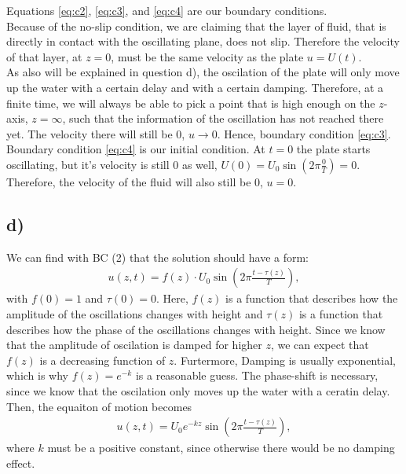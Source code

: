 \documentclass{article}
\begin{document}
Equations \ref{eq:c2}, \ref{eq:c3}, and \ref{eq:c4} are our boundary conditions. \\
Because of the no-slip condition, we are claiming that the layer of fluid, that is directly in contact with the oscillating plane, does not slip. Therefore the velocity of that layer,
 at $z = 0$, must be the same velocity as the plate $u = U(t)$. \\
As also will be explained in question d), the oscilation of the plate will only move up the water with a certain delay and with a certain damping. Therefore, at a finite time, 
we will always be able to pick a point that is high 
enough on the $z$-axis, $z = \infty$, such that the information of the oscillation has not reached there yet. The velocity there will still be 0, $u \rightarrow 0$. Hence, boundary condition \ref{eq:c3}. \\
Boundary condition \ref{eq:c4} is our initial condition. At $t = 0$ the plate starts oscillating, but it's velocity is still $0$ as well, $U(0) = U_0 \sin(2\pi \frac{0}{T}) = 0$. 
Therefore, the velocity of the fluid will also still be $0$, $u = 0$.


\subsection*{d)}
We can find with BC (2) that the solution should have a form: 
\begin{align*}
    u(z,t) = f(z)\cdot U_0 \sin\!\left( 2\pi \frac{t - \tau(z)}{T} \right),
\end{align*}
with $f(0)=1$ and $\tau(0)=0$. Here, $f(z)$ is a function that describes how the amplitude of the oscillations changes with height and $\tau(z)$ is a function that describes how the phase of the oscillations changes with height. Since we know that the amplitude of oscilation is damped for higher $z$, we can expect that $f(z)$ is a decreasing function of $z$. Furtermore, Damping is usually exponential, which is why $f(z)=e^{-k}$ is a reasonable guess. The phase-shift is necessary, since we know that the oscilation only moves up the water with a ceratin delay. Then, the equaiton of motion becomes
\begin{align*}
    u(z,t) = U_0 e^{-kz} \sin\!\left( 2\pi \frac{t - \tau(z)}{T} \right),
\end{align*}
where $k$ must be a positive constant, since otherwise there would be no damping effect.\\
\end{document}
